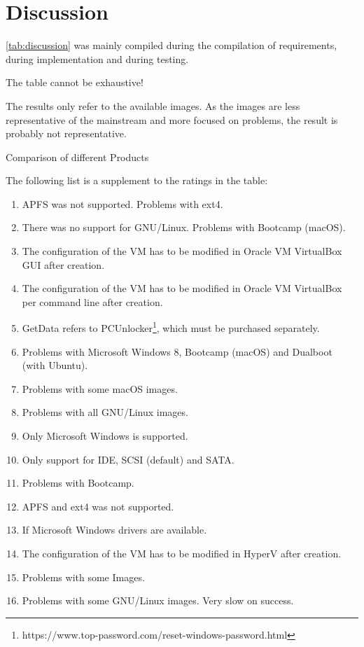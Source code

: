 \chapter{Discussion}
\label{chap:discussion}

\cref{tab:discussion} was mainly compiled during the compilation of requirements, during implementation and during testing.

The table cannot be exhaustive!

The results only refer to the available images. As the images are less representative of the mainstream and more focused on problems, the result is probably not representative.

\begin{table}[htbp]
  \centering
  \caption[Comparison]{Comparison of different Products}
  \label{tab:discussion}
\end{table}

The following list is a supplement to the ratings in the table:

\begin{enumerate}
  \item APFS was not supported. Problems with ext4.
  \item There was no support for GNU/Linux. Problems with Bootcamp (macOS).
  \item The configuration of the VM has to be modified in Oracle VM VirtualBox GUI after creation.
  \item The configuration of the VM has to be modified in Oracle VM VirtualBox per command line after creation.
  \item GetData refers to PCUnlocker\footnote{https://www.top-password.com/reset-windows-password.html}, which must be purchased separately.
  \item Problems with Microsoft Windows 8, Bootcamp (macOS) and Dualboot (with Ubuntu).
  \item Problems with some macOS images.
  \item Problems with all GNU/Linux images.
  \item Only Microsoft Windows is supported.
  \item Only support for IDE, SCSI (default) and SATA.
  \item Problems with Bootcamp.
  \item APFS and ext4 was not supported.
  \item If Microsoft Windows drivers are available.
  \item The configuration of the VM has to be modified in HyperV after creation.
  \item Problems with some Images.
  \item Problems with some GNU/Linux images. Very slow on success.
\end{enumerate}

